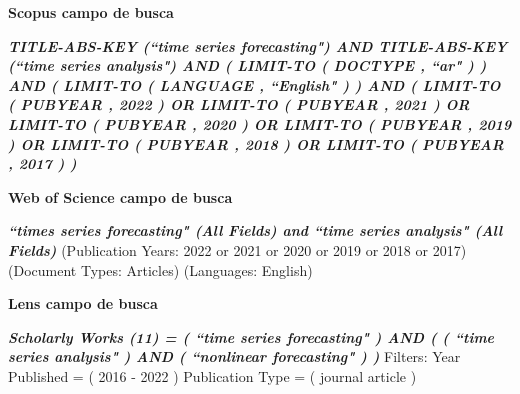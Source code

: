 
\textbf{Scopus campo de busca}

\textbf{\textit{TITLE-ABS-KEY (``time series forecasting")  AND  TITLE-ABS-KEY (``time series analysis")  AND  ( LIMIT-TO ( DOCTYPE ,  ``ar" ) )  AND  ( LIMIT-TO ( LANGUAGE ,  ``English" ) )  AND  ( LIMIT-TO ( PUBYEAR ,  2022 )  OR LIMIT-TO ( PUBYEAR ,  2021 )  OR  LIMIT-TO ( PUBYEAR ,  2020 )  OR  LIMIT-TO ( PUBYEAR ,  2019 )  OR  LIMIT-TO ( PUBYEAR ,  2018 )  OR  LIMIT-TO ( PUBYEAR ,  2017 ) )}}

\textbf{Web of Science campo de busca}

\textit{\textbf{``times series forecasting" (All Fields) and ``time series analysis" (All Fields)}} (Publication Years: 2022 or 2021 or 2020 or 2019 or 2018 or 2017) (Document Types: Articles) (Languages: English)

\textbf{Lens campo de busca}

\textit{\textbf{Scholarly Works (11) = ( ``time series forecasting" ) AND ( ( ``time series analysis" ) AND ( ``nonlinear forecasting" ) ) }}
Filters: Year Published = ( 2016 - 2022  ) Publication Type = ( journal article  )\\